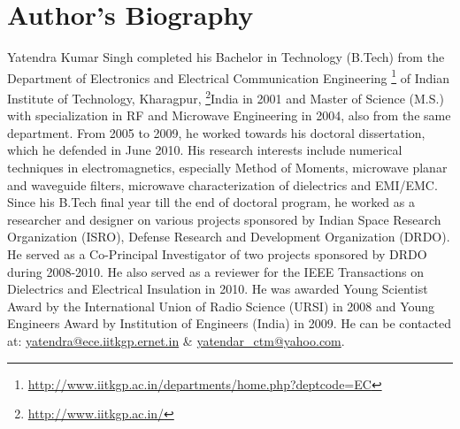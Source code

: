 \chapter*{Author's Biography}
\noindent
\begin{spacing}{1.4}
{\LARGE Y}atendra Kumar Singh completed his Bachelor in Technology (B.Tech) from the Department of Electronics and Electrical Communication Engineering \footnote{\url{http://www.iitkgp.ac.in/departments/home.php?deptcode=EC}} of Indian Institute of Technology, Kharagpur, \footnote{\url{http://www.iitkgp.ac.in/}}India in 2001 and Master of Science (M.S.) with specialization in RF and Microwave Engineering in 2004, also from the same department. From 2005 to 2009, he worked towards his doctoral dissertation, which he defended in June 2010. His research interests include numerical techniques in electromagnetics, especially Method of Moments, microwave planar and waveguide filters, microwave characterization of dielectrics and EMI/EMC. Since his B.Tech final year till the end of doctoral program, he worked as a researcher and designer on various projects sponsored by Indian Space Research Organization (ISRO), Defense Research and Development Organization (DRDO). He served as a Co-Principal Investigator of two projects sponsored by DRDO during 2008-2010. He also served as a reviewer for the IEEE Transactions on Dielectrics and Electrical Insulation in 2010. He was awarded Young Scientist Award by the International Union of Radio Science (URSI) in 2008 and Young Engineers Award by Institution of Engineers (India) in 2009.
He can be contacted at: \url{yatendra@ece.iitkgp.ernet.in} \& \url{yatendar_ctm@yahoo.com}.
\end{spacing}



